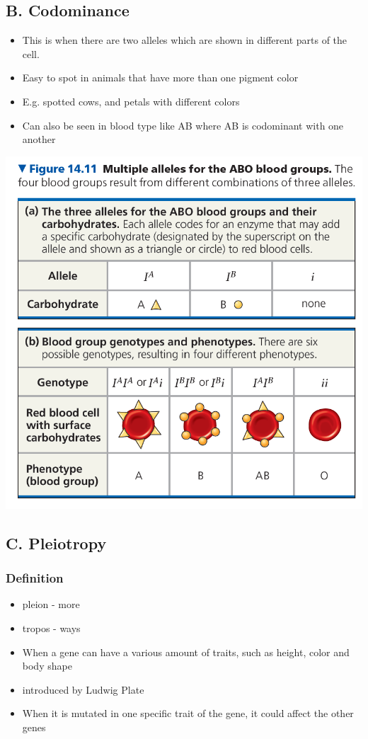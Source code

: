 \documentclass{article}
\begin{document}
\subsection*{B. Codominance}
\begin{itemize}
    \item This is when there are two alleles which are shown in different parts of the cell.
    \item Easy to spot in animals that have more than one pigment color
    \item E.g. spotted cows, and petals with different colors
    \item Can also be seen in blood type like AB where AB is codominant with one another
\end{itemize}\includegraphics*[scale=0.7]{codeminance2.png}


\subsection*{C. Pleiotropy}
\subsubsection*{Definition}
\begin{itemize}
    \item pleion - more
    \item tropos - ways
    \item When a gene can have a various amount of traits, such as height, color and body shape
    \item introduced by Ludwig Plate
    \item When it is mutated in one specific trait of the gene, it could affect the other genes
\end{itemize}
\end{document}
